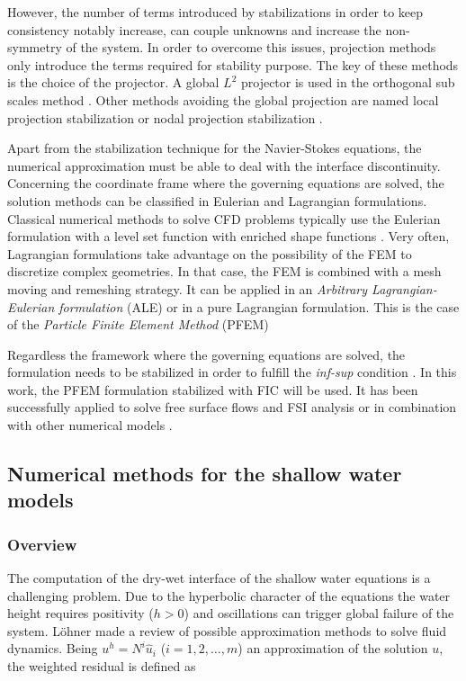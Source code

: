 However, the number of terms introduced by stabilizations in order to keep consistency notably increase, can couple unknowns and increase the non-symmetry of the system. In order to overcome this issues, projection methods only introduce the terms required for stability purpose. The key of these methods is the choice of the projector. A global $L^2$ projector is used in the orthogonal sub scales method \cite{codina2000}. Other methods avoiding the global projection are named local projection stabilization \cite{braack2006,matthies2007} or nodal projection stabilization \cite{badia2012}.


Apart from the stabilization technique for the Navier-Stokes equations, the numerical approximation must be able to deal with the interface discontinuity. Concerning the coordinate frame where the governing equations are solved, the solution methods can be classified in Eulerian and Lagrangian formulations. Classical numerical methods to solve CFD problems typically use the Eulerian formulation with a level set function \cite{chen1997} with enriched shape functions \cite{burman2015cut}. Very often, Lagrangian formulations take advantage on the possibility of the FEM to discretize complex geometries. In that case, the FEM is combined with a mesh moving and remeshing strategy. It can be applied in an \emph{Arbitrary Lagrangian-Eulerian formulation} (ALE) \cite{donea2004} or in a pure Lagrangian formulation. This is the case of the \emph{Particle Finite Element Method} (PFEM) \cite{onate2004,idelsohn2004}

Regardless the framework where the governing equations are solved, the formulation needs to be stabilized in order to fulfill the \emph{inf-sup} condition \cite{brezzi1991}. In this work, the PFEM formulation stabilized with FIC will be used. It has been successfully applied to solve free surface flows \cite{delpin2007} and FSI analysis \cite{onate2008} or in combination with other numerical models \cite{onate2022}.


\subsection{Numerical methods for the shallow water models}


\subsubsection{Overview}

The computation of the dry-wet interface of the shallow water equations is a challenging problem. Due to the hyperbolic character of the equations the water height requires positivity ($h>0$) and oscillations can trigger global failure of the system. Löhner \cite{lohner2008} made a review of possible approximation methods to solve fluid dynamics. Being $u^h = N^i\hat{u}_i$ ($i=1,2,\dots,m$) an approximation of the solution $u$, the weighted residual is defined as

